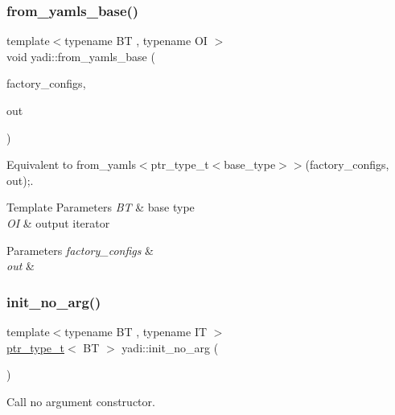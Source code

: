 \subsubsection{\texorpdfstring{from\+\_\+yamls\+\_\+base()}{from\_yamls\_base()}}
{\footnotesize\ttfamily template$<$typename BT , typename OI $>$ \\
void yadi\+::from\+\_\+yamls\+\_\+base (\begin{DoxyParamCaption}\item[{Y\+A\+M\+L\+::\+Node const \&}]{factory\+\_\+configs,  }\item[{OI}]{out }\end{DoxyParamCaption})}



Equivalent to from\+\_\+yamls$<$ptr\+\_\+type\+\_\+t$<$base\+\_\+type$>$$>$(factory\+\_\+configs, out);. 


\begin{DoxyTemplParams}{Template Parameters}
{\em BT} & base type \\
\hline
{\em OI} & output iterator \\
\hline
\end{DoxyTemplParams}

\begin{DoxyParams}{Parameters}
{\em factory\+\_\+configs} & \\
\hline
{\em out} & \\
\hline
\end{DoxyParams}
\mbox{\label{namespaceyadi_a29e6a880477f8ed0163fbfc66aa6e5ba}} 
\subsubsection{\texorpdfstring{init\+\_\+no\+\_\+arg()}{init\_no\_arg()}}
{\footnotesize\ttfamily template$<$typename BT , typename IT $>$ \\
\hyperlink{namespaceyadi_a92290eb27cd90666aa87b17d854af9fe}{ptr\+\_\+type\+\_\+t}$<$ BT $>$ yadi\+::init\+\_\+no\+\_\+arg (\begin{DoxyParamCaption}\item[{Y\+A\+M\+L\+::\+Node const \&}]{ }\end{DoxyParamCaption})}



Call no argument constructor. 


